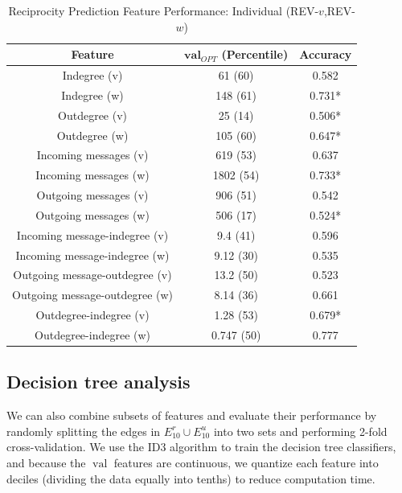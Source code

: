 \documentclass[conference]{IEEEtran}
\begin{document}
\begin{table}[!t]
\renewcommand{\arraystretch}{1.3}
\caption{Reciprocity Prediction Feature Performance: Individual (REV-$v$,REV-$w$)}
\label{table_recresults_indivVW}
\centering
\begin{tabular}{|c||c|c|}
\hline
\bf{Feature} & $\mathbf{val}_{OPT}$ (Percentile) & \bf{Accuracy} \\
\hline
Indegree (v) &  61 (60) & 0.582 \\
Indegree (w) & 148 (61) & 0.731* \\
Outdegree (v) & 25 (14) & 0.506* \\
Outdegree (w) & 105 (60) & 0.647* \\
\hline
Incoming messages (v) & 619 (53) & 0.637 \\
Incoming messages (w) & 1802 (54) & 0.733* \\
Outgoing messages (v) & 906 (51) & 0.542 \\
Outgoing messages (w) & 506 (17) & 0.524* \\
\hline
Incoming message-indegree (v) & 9.4 (41) & 0.596 \\
Incoming message-indegree (w) & 9.12 (30) & 0.535 \\
Outgoing message-outdegree (v) & 13.2 (50) & 0.523 \\
Outgoing message-outdegree (w) & 8.14 (36) & 0.661 \\
\hline
Outdegree-indegree (v) & 1.28 (53) & 0.679* \\
Outdegree-indegree (w) & 0.747 (50) & 0.777 \\
\hline
\end{tabular}
\end{table}

\subsection{Decision tree analysis}

We can also
combine subsets of features and evaluate their performance by randomly splitting the edges in $E^r_{10} \cup E_{10}^u$ into two sets and performing 2-fold cross-validation. 
We use the ID3 algorithm to train the decision tree classifiers, and
because the $\operatorname{val}$ features are continuous, we quantize
each feature into deciles (dividing the data equally into tenths) to
reduce computation time.
\end{document}
